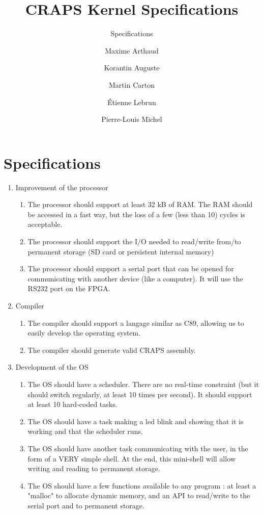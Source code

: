 \documentclass{article}
\title{CRAPS Kernel Specifications}
\subtitle{Specifications}
\author{
       Maxime Arthaud
  \and Korantin Auguste
  \and Martin Carton
  \and Étienne Lebrun
  \and Pierre-Louis Michel
}
\begin{document}
  
  \newpage

  \section{Specifications}

    \begin{enumerate}
    \item Improvement of the processor
        \begin{enumerate}
        \item The processor should support at least 32 kB of RAM. The RAM should be accessed in a fast way, but the loss of a few (less than 10) cycles is acceptable.
        \item The processor should support the I/O needed to read/write from/to permanent storage (SD card or persistent internal memory)
        \item The processor should support a serial port that can be opened for communicating with another device (like a computer). It will use the RS232 port on the FPGA.
        \end{enumerate}
    \item Compiler
        \begin{enumerate}
        \item The compiler should support a langage similar as C89, allowing us to easily develop the operating system.
        \item The compiler should generate valid CRAPS assembly.
        \end{enumerate}
    \item Development of the OS
        \begin{enumerate}
        \item The OS should have a scheduler. There are no real-time constraint (but it should switch regularly, at least 10 times per second). It should support at least 10 hard-coded tasks.
        \item The OS should have a task making a led blink and showing that it is working and that the scheduler runs.
        \item The OS should have another task communicating with the user, in the form of a VERY simple shell. At the end, this mini-shell will allow writing and reading to permanent storage.
        \item The OS should have a few functions available to any program : at least a "malloc" to allocate dynamic memory, and an API to read/write to the serial port and to permanent storage.
        \end{enumerate}
    \end{enumerate}
\end{document}
